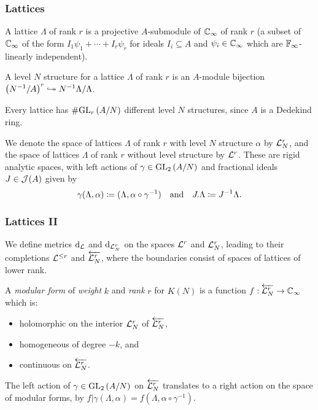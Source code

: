 \begin{frame} \frametitle{Lattices}
  \begin{definition}
    A lattice $\Lambda$ of rank $r$ is a projective $A$-submodule of $\CC_\infty$ of rank $r$ \pause (\ie a subset of $\CC_\infty$ of the form $I_1\psi_1 +\dotsb +I_r\psi_r$ for ideals $I_i \subseteq A$ and $\psi_i \in \CC_\infty$ which are $\FF_\infty$-linearly independent). \pause

    A level $N$ structure for a lattice $\Lambda$ of rank $r$ is an $A$-module bijection $\parens{N^{-1}/A}^r \ionto N^{-1}\Lambda/\Lambda$.
  \end{definition} \pause

  Every lattice has $\size{\GL[r]{A/N}}$ different level $N$ structures, since $A$ is a Dedekind ring.

  We denote the space of lattices $\Lambda$ of rank $r$ with level $N$ structure $\alpha$ by $\LL_N^r$, and the space of lattices $\Lambda$ of rank $r$ without level structure by $\LL^r$. \pause
  These are rigid analytic spaces, with left actions of $\gamma \in \GL[2]{A/N}$ and fractional ideals $J \in \cJ(A)$ given by
  \[ \gamma(\Lambda,\alpha) \defeq (\Lambda, \alpha \circ \gamma^{-1}) \lrsptext{and} J.\Lambda \defeq J^{-1} \Lambda. \]
\end{frame}


\begin{frame} \frametitle{Lattices II}
  We define metrics $\dd_\LL$ and $\dd_{\LL_N^r}$ on the spaces $\LL^r$ and $\LL_N^r$, leading to their completions $\LL^{\leq r}$ and $\LLNRi$, where the boundaries consist of spaces of lattices of lower rank. \pause
  \begin{definition} \label{def:strongMForm}
    A \emph{modular form} of \emph{weight} $k$ and \emph{rank} $r$ for $K(N)$ is a function $f : \LLNRi \to \CCi$ which is: \pause
    \begin{itemize}
      \item holomorphic on the interior $\LL_N^r$ of $\LLNRi$\pause,
      \item homogeneous of degree $-k$\pause, and
      \item continuous on $\LLNRi$. \pause
    \end{itemize}
  \end{definition}

  The left action of $\gamma \in \GL[2]{A/N}$ on $\LLNRi$ translates to a right action on the space of modular forms, by $f|\gamma(\Lambda,\alpha) = f(\Lambda, \alpha \circ \gamma^{-1})$.
\end{frame}